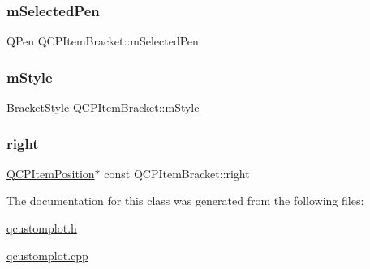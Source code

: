 \mbox{\label{class_q_c_p_item_bracket_adcfb53602d1802d00e2de4fd6df6b291}} 
\subsubsection{\texorpdfstring{m\+Selected\+Pen}{mSelectedPen}}
{\footnotesize\ttfamily Q\+Pen Q\+C\+P\+Item\+Bracket\+::m\+Selected\+Pen\hspace{0.3cm}{\ttfamily [protected]}}

\mbox{\label{class_q_c_p_item_bracket_ac911907184c824d621f274f8e0990080}} 
\subsubsection{\texorpdfstring{m\+Style}{mStyle}}
{\footnotesize\ttfamily \hyperlink{class_q_c_p_item_bracket_a7ac3afd0b24a607054e7212047d59dbd}{Bracket\+Style} Q\+C\+P\+Item\+Bracket\+::m\+Style\hspace{0.3cm}{\ttfamily [protected]}}

\mbox{\label{class_q_c_p_item_bracket_afa6c1360b05a50c4e0df37b3cebab6be}} 
\subsubsection{\texorpdfstring{right}{right}}
{\footnotesize\ttfamily \hyperlink{class_q_c_p_item_position}{Q\+C\+P\+Item\+Position}$\ast$ const Q\+C\+P\+Item\+Bracket\+::right}



The documentation for this class was generated from the following files\+:\begin{DoxyCompactItemize}
\item 
\hyperlink{qcustomplot_8h}{qcustomplot.\+h}\item 
\hyperlink{qcustomplot_8cpp}{qcustomplot.\+cpp}\end{DoxyCompactItemize}
